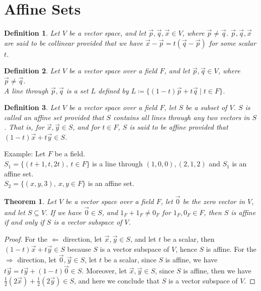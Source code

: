 \documentclass[15pt]{book}
\theoremstyle{break}
\theoremstyle{break}
\newtheorem{thm}{Theorem}[section]
\newtheorem{defn}{Definition}[corL]
\newcommand{\example}{\color{green}Example: \color{black}}
\begin{document}
\newpage
\section[Affine Sets]{\color{red} Affine Sets \color{black}}
\begin{defn}
Let $V$ be a vector space, and let $\vec{p}, \vec{q}, \vec{x} \in V$, where $\vec{p}\neq \vec{q}$. $\vec{p}, \vec{q}, \vec{x}$ are said to be collinear provided that we have $\vec{x}-\vec{p} = t\left(\vec{q}-\vec{p}\right)$ for some scalar $t$. \end{defn}

\begin{defn}
Let $V$ be a vector space over a field $F$, and let $\vec{p}, \vec{q} \in V$, where $\vec{p}\neq \vec{q}$. \\
A line through $\vec{p}, \vec{q}$ is a set $L$ defined by $L \coloneqq \{(1-t)\vec{p}+t\vec{q} \mid t \in F\}$. 
\end{defn}

\begin{defn}Let $V$ be a vector space over a field $F$, let $S$ be a subset of $V$. $S$ is called an affine set provided that $S$ contains all lines through any two vectors in $S$. That is, for $\vec{x},\vec{y} \in S$, and for $t\in F$, $S$ is said to be affine provided that $(1-t)\vec{x} + t\vec{y} \in S$. \end{defn}

\example Let $F$ be a field.\\
$S_1  = \{ (t+1,t,2t),\ t\in F\}$ is a line through $(1,0,0), (2,1,2)$ and $S_1$ is an affine set.\\
$S_2 = \{(x,y,3),\ x,y \in F\}$ is an affine set.\\

\begin{thm}
Let $V$ be a vector space over a field $F$, let $\vec{0}$ be the zero vector in $V$, and let $S\subseteq V$. If we have $\vec{0} \in S$, and $1_F+1_F \neq 0_F$ for $1_F, 0_F \in F$, then $S$ is affine if and only if $S$ is a vector subspace of $V$.
\end{thm}
\begin{proof}
For the $\Leftarrow$ direction, let $\vec{x},\vec{y}\in S$, and let $t$ be a scalar, then $(1-t)\vec{x}+t\vec{y} \in S$ because $S$ is a vector subspace of $V$, hence $S$ is affine. For the $\Rightarrow$ direction, let $\vec{0},\vec{y}\in S$, let $t$ be a scalar, since $S$ is affine, we have $t\vec{y}=t\vec{y}+(1-t)\vec{0}\in S$. Moreover, let $\vec{x},\vec{y} \in S$, since $S$ is affine, then we have $\frac{1}{2}(2\vec{x})+\frac{1}{2}(2\vec{y})\in S$, and here we conclude that $S$ is a vector subspace of $V$.
\end{proof}
\end{document}
